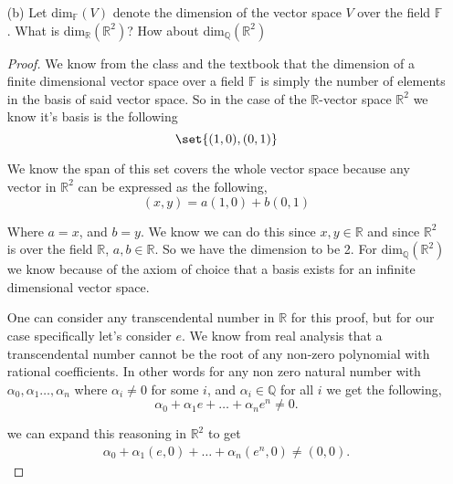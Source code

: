 \documentclass[12pt]{article}
\DeclarePairedDelimiter\set\{\}
\newcommand      {\Qm}         {{\mathbb Q}}
\newcommand      {\Rm}         {{\mathbb R}}
\newcommand      {\Fm}          {{\mathbb F}}
\begin{document}
\begin{itemize}
\begin{itemize}
\begin{proof}
            We can now let this collection $S$ be the collection of all linearly independent subsets of $V$. Because the union of an increasing chain of linearly independent sets is also a linearly independent set, we can apply Zorn's Lemma as stated before and guarantee that there will be a maximal linearly independent set in this collection. This maximal linearly independent set will then serve as the basis for $V$. The reason we know it can is if there were to exist another linearly independent vector in $V$ not covered by the span of the maximal set, then that would be a contradiction since the maximal set by definition cannot be properly contained by another subset.
        \end{proof}
        \item[(b)] Let dim$_\Fm (V)$ denote the dimension of the vector space $V$ over the field $\Fm$. What is  dim$_\Rm(\Rm^2)$? How about dim$_\Qm(\Rm^2)$
        \begin{proof}
            We know from the class and the textbook that the dimension of a finite dimensional vector space over a field $\Fm$ is simply the number of elements in the basis of said vector space. So in the case of the $\Rm$-vector space $\Rm^2$ we know it's basis is the following \[\set{(1,0),(0,1)}\]

            We know the span of this set covers the whole vector space because any vector in $\Rm^2$ can be expressed as the following,
            \[(x,y) = a(1,0)+b(0,1)\]

            Where $a =x$, and $b = y$. We know we can do this since $x,y \in \Rm$ and since $\Rm^2$ is over the field $\Rm$, $a,b\in \Rm$. So we have the dimension to be 2.  
            \newpage
            For dim$_\Qm(\Rm^2)$ we know because of the axiom of choice that a basis exists for an infinite dimensional vector space. 

            One can consider any transcendental number in $\Rm$ for this proof, but for our case specifically let's consider $e$. We know from real analysis that a transcendental number cannot be the root of any non-zero polynomial with rational coefficients. In other words for any non zero natural number with $\alpha_0,\alpha_1\dots,\alpha_n $ where $\alpha_i \neq 0$ for some $i$, and $\alpha_i \in \Qm$ for all $i$ we get the following,
            \[\alpha_0 + \alpha_1e + \dots + \alpha_n e^n \neq 0.\]

            we can expand this reasoning in $\Rm^2$ to get
            \begin{align*}
                \alpha_0 + \alpha_1(e,0) +\dots +\alpha_n (e^n,0) \neq (0,0).
            \end{align*}


\end{proof}
\end{itemize}
\end{itemize}
\end{document}
